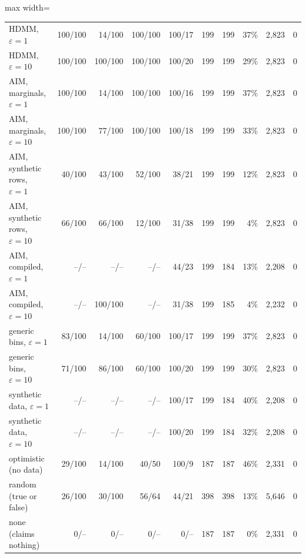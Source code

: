 \begin{table}[t]
\begin{adjustbox}{max width=\linewidth}
\begin{tabular}{@{}lrrrrrrrrr@{}}
HDMM, $\varepsilon = 1$ & 100/100 & 14/100 & 100/100 & 100/17 & 199 & 199 & 37\% & 2,823 & 0 \\
HDMM, $\varepsilon = 10$ & 100/100 & 100/100 & 100/100 & 100/20 & 199 & 199 & 29\% & 2,823 & 0 \\
AIM, marginals, $\varepsilon = 1$ & 100/100 & 14/100 & 100/100 & 100/16 & 199 & 199 & 37\% & 2,823 & 0 \\
AIM, marginals, $\varepsilon = 10$ & 100/100 & 77/100 & 100/100 & 100/18 & 199 & 199 & 33\% & 2,823 & 0 \\
AIM, synthetic rows, $\varepsilon = 1$ & 40/100 & 43/100 & 52/100 & 38/21 & 199 & 199 & 12\% & 2,823 & 0 \\
AIM, synthetic rows, $\varepsilon = 10$ & 66/100 & 66/100 & 12/100 & 31/38 & 199 & 199 & 4\% & 2,823 & 0 \\
AIM, compiled, $\varepsilon = 1$ & --/-- & --/-- & --/-- & 44/23 & 199 & 184 & 13\% & 2,208 & 0 \\
AIM, compiled, $\varepsilon = 10$ & --/-- & 100/100 & --/-- & 31/38 & 199 & 185 & 4\% & 2,232 & 0 \\
generic bins, $\varepsilon = 1$ & 83/100 & 14/100 & 60/100 & 100/17 & 199 & 199 & 37\% & 2,823 & 0 \\
generic bins, $\varepsilon = 10$ & 71/100 & 86/100 & 60/100 & 100/20 & 199 & 199 & 30\% & 2,823 & 0 \\
synthetic data, $\varepsilon = 1$ & --/-- & --/-- & --/-- & 100/17 & 199 & 184 & 40\% & 2,208 & 0 \\
synthetic data, $\varepsilon = 10$ & --/-- & --/-- & --/-- & 100/20 & 199 & 184 & 32\% & 2,208 & 0 \\
optimistic (no data) & 29/100 & 14/100 & 40/50 & 100/9 & 187 & 187 & 46\% & 2,331 & 0 \\
random (true or false) & 26/100 & 30/100 & 56/64 & 44/21 & 398 & 398 & 13\% & 5,646 & 0 \\
none (claims nothing) & 0/-- & 0/-- & 0/-- & 0/-- & 187 & 187 & 0\% & 2,331 & 0 \\
\bottomrule
\end{tabular}
\end{adjustbox}
\end{table}
